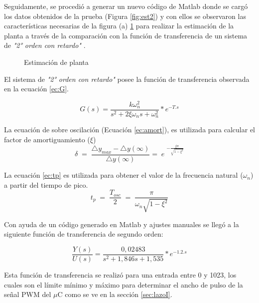     Seguidamente, se procedió a generar un nuevo código de Matlab donde se cargó los datos obtenidos de la prueba (Figura \ref{fig:est2}) y con ellos se observaron las características necesarias de la figura (a) \ref{fig:pl2} para realizar la estimación de la planta a través de la comparación con la función de transferencia de un sistema de \textit{"2° orden con retardo"} \cite{pomares2011sistemas}.
    
    \begin{figure}[H]
    	\centering
    	\caption{Estimación de planta} \label{fig:pl2}
    \end{figure}

El sistema de \textit{"2° orden con retardo"} posee la función de transferencia observada en la ecuación \ref{ec:G}.

 \begin{equation}
 	G(s)=\frac{k\omega_n^2}{s^2+2\xi\omega_ns+\omega_n^2}\ast e^{-T.s}
 	\label{ec:G}
 \end{equation}

La ecuación de sobre oscilación (Ecuación \ref{ec:amort}), es utilizada para calcular el factor de amortiguamiento ($\xi$)
\begin{equation}
	\delta\;=\;\frac{\triangle y_{max}-\triangle y\left(\infty\right)}{\triangle y\left(\infty\right)}=\;e\;^{-\frac{\xi\pi}{\sqrt{1-\xi^2}}}
	\label{ec:amort}
\end{equation}

La ecuación \ref{ec:tp} es utilizada para obtener el valor de la frecuencia natural ($\omega_n$) a partir del tiempo de pico.
\begin{equation}
t_p\;=\;\frac{T_{osc}}2\;=\;\frac\pi{\omega_n\sqrt{1-\xi^2}}
\label{ec:tp}
\end{equation}

    
    Con ayuda de un código generado en Matlab y ajustes manuales se llegó a la siguiente función de transferencia de segundo orden:
    
    \begin{equation}
    	\frac{Y(s)}{U(s)}=\frac{0,02483}{s^2+1,846s+1,535}*e^{-1.2.s}
    \end{equation}
   
    Esta función de transferencia se realizó para una entrada entre 0 y 1023, los cuales son el límite mínimo y máximo para determinar el ancho de pulso de la señal PWM del $\mu$C como se ve en la sección \ref{sec:lazoI}.
    
